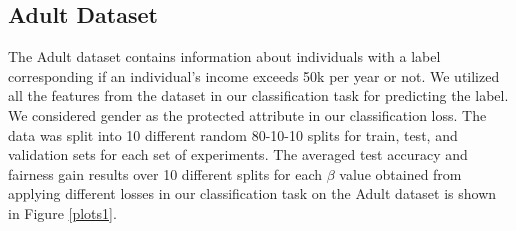 \subsection{Adult Dataset}
The Adult dataset contains information about individuals with a label corresponding if an individual's income exceeds 50k per year or not. We utilized all the features from the dataset in our classification task for predicting the label. We considered gender as the protected attribute in our classification loss. The data was split into 10 different random 80-10-10 splits for train, test, and validation sets for each set of experiments. The averaged test accuracy and fairness gain results over 10 different splits for each $\beta$ value obtained from applying different losses in our classification task on the Adult dataset is shown in Figure \ref{plots1}.


